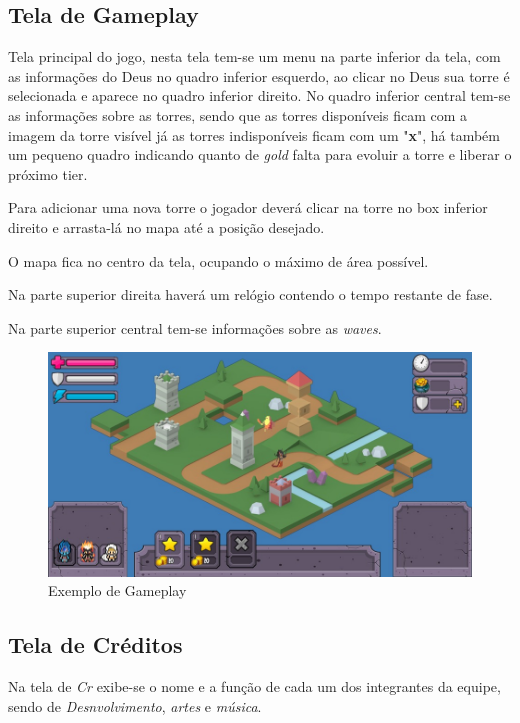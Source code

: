 \documentclass[11pt]{article} %
\begin{document}
\newpage

\subsection{Tela de Gameplay}

Tela principal do jogo, nesta tela tem-se um menu na parte inferior da tela, com as informações do Deus no quadro inferior esquerdo, ao clicar no Deus sua torre é selecionada e aparece no quadro inferior direito.
No quadro inferior central tem-se as informações sobre as torres, sendo que as torres disponíveis ficam com a imagem da torre visível já as torres indisponíveis ficam com um "\textbf{x}", há também um pequeno quadro indicando quanto de \textit{gold} falta para evoluir a torre e liberar o próximo tier.

Para adicionar uma nova torre o jogador deverá clicar na torre no box inferior direito e arrasta-lá no mapa até a posição desejado.

O mapa fica no centro da tela, ocupando o máximo de área possível.

Na parte superior direita haverá um relógio contendo o tempo restante de fase.

Na parte superior central tem-se informações sobre as \textit{waves}.

\begin{figure}[!htp]
\centering
\includegraphics[scale=0.5]{res/gameplay.jpg}
\caption{Exemplo de Gameplay}
\end{figure}

\newpage
\subsection{Tela de Créditos}

Na tela de \textit{Cr} exibe-se o nome e a função de cada um dos integrantes da equipe, sendo de \textit{Desnvolvimento}, \textit{artes} e \textit{música}.
\end{document}
